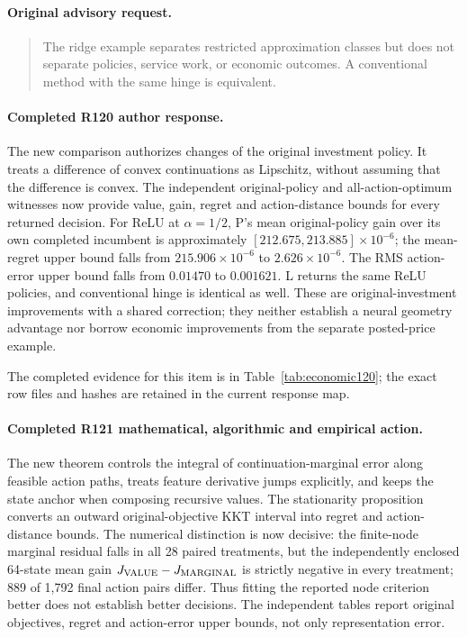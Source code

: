 \paragraph{Original advisory request.}
\begin{quote}
The ridge example separates restricted approximation classes but does not separate policies, service work, or economic outcomes. A conventional method with the same hinge is equivalent.
\end{quote}

\paragraph{Completed R120 author response.}
The new comparison authorizes changes of the original investment policy. It treats a difference of convex continuations as Lipschitz, without assuming that the difference is convex. The independent original-policy and all-action-optimum witnesses now provide value, gain, regret and action-distance bounds for every returned decision. For ReLU at $\alpha=1/2$, P's mean original-policy gain over its own completed incumbent is approximately $[212.675,213.885]\times10^{-6}$; the mean-regret upper bound falls from $215.906\times10^{-6}$ to $2.626\times10^{-6}$. The RMS action-error upper bound falls from $0.01470$ to $0.001621$. L returns the same ReLU policies, and conventional hinge is identical as well. These are original-investment improvements with a shared correction; they neither establish a neural geometry advantage nor borrow economic improvements from the separate posted-price example.

The completed evidence for this item is in Table~\ref{tab:economic120}; the exact row files and hashes are retained in the current response map.

\paragraph{Completed R121 mathematical, algorithmic and empirical action.}
The new theorem controls the integral of continuation-marginal error along feasible action paths, treats feature derivative jumps explicitly, and keeps the state anchor when composing recursive values. The stationarity proposition converts an outward original-objective KKT interval into regret and action-distance bounds. The numerical distinction is now decisive: the finite-node marginal residual falls in all 28 paired treatments, but the independently enclosed 64-state mean gain $J_{\rm VALUE}-J_{\rm MARGINAL}$ is strictly negative in every treatment; 889 of 1,792 final action pairs differ. Thus fitting the reported node criterion better does not establish better decisions. The independent tables report original objectives, regret and action-error upper bounds, not only representation error.


